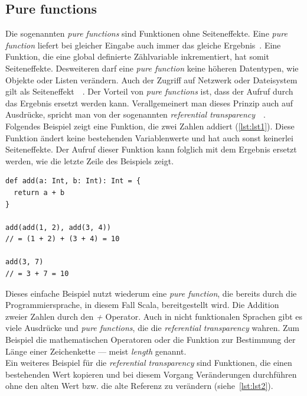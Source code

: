 \subsection{Pure functions}
Die sogenannten \textit{pure functions} sind Funktionen ohne Seiteneffekte. Eine \textit{pure function} liefert bei gleicher Eingabe auch immer das gleiche Ergebnis~\cite[S.~61]{kuhn_reactive_2015}. Eine Funktion, die eine global definierte Zählvariable inkrementiert, hat somit Seiteneffekte. Desweiteren darf eine \textit{pure function} keine höheren Datentypen, wie Objekte oder Listen verändern. Auch der Zugriff auf Netzwerk oder Dateisystem gilt als Seiteneffekt~\cite[S.~3]{chiusano_functional_2015}~\cite[S.~62]{kuhn_reactive_2015}.
Der Vorteil von \textit{pure functions} ist, dass der Aufruf durch das Ergebnis ersetzt werden kann. Verallgemeinert man dieses Prinzip auch auf Ausdrücke, spricht man von der sogenannten \textit{referential transparency}~\cite[S.~9]{chiusano_functional_2015}~\cite[S.~62]{kuhn_reactive_2015}. Folgendes Beispiel zeigt eine Funktion, die zwei Zahlen addiert (\ref{lst:lst1}). Diese Funktion ändert keine bestehenden Variablenwerte und hat auch sonst keinerlei Seiteneffekte. Der Aufruf dieser Funktion kann folglich mit dem Ergebnis ersetzt werden, wie die letzte Zeile des Beispiels zeigt.

\begin{lstlisting}[caption={Beispiel für eine \textit{pure funcition}},label={lst:lst1}]
def add(a: Int, b: Int): Int = {
  return a + b
}

add(add(1, 2), add(3, 4))
// = (1 + 2) + (3 + 4) = 10

add(3, 7)
// = 3 + 7 = 10
\end{lstlisting}

Dieses einfache Beispiel nutzt wiederum eine \textit{pure function}, die bereits durch die Programmiersprache, in diesem Fall Scala, bereitgestellt wird. Die Addition zweier Zahlen durch den \textit{+} Operator. Auch in nicht funktionalen Sprachen gibt es viele Ausdrücke und \textit{pure functions}, die die \textit{referential transparency} wahren. Zum Beispiel die mathematischen Operatoren oder die Funktion zur Bestimmung der Länge einer Zeichenkette --- meist \textit{length} genannt.\\

Ein weiteres Beispiel für die \textit{referential transparency} sind Funktionen, die einen bestehenden Wert kopieren und bei diesem Vorgang Veränderungen durchführen ohne den alten Wert bzw. die alte Referenz zu verändern (siehe~\autoref{lst:lst2}).

